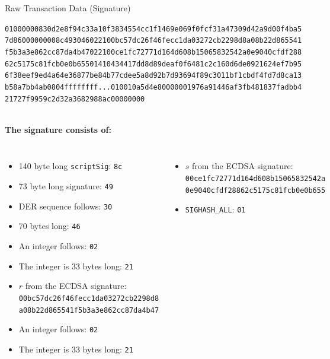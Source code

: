 \documentclass[]{beamer}
\begin{document}
\begin{frame}{Raw Transaction Data (Signature)}
\begin{scriptsize}
\texttt{\textcolor{black!30}{01000000830d2e8f94c33a10f3834554cc1f1469e069f0fcf31a47309d42a9d00f4ba5
7d8600000000}{\alert<2>{8c}\alert<3>{49}\alert<4>{30}\alert<5>{46}\alert<6>{02}\alert<7>{21}\alert<8>{00bc57dc26f46fecc1da03272cb2298d8a08b22d865541
f5b3a3e862cc87da4b47}\alert<9>{02}\alert<10>{21}\alert<11>{00ce1fc72771d164d608b15065832542a0e9040cfdf288
62c5175c81fcb0e0b655}\alert<12>{01}\alert<13>{41}\alert<14>{04}\alert<15>{34417dd8d89deaf0f6481c2c160d6de0921624ef7b95
6f38eef9ed4a64e36877be84b77cdee5a8d92b7d93694f89c3011bf1cbdf4fd7d8ca13
b58a7bb4ab0804}}\textcolor{black!30}{ffffffff...010010a5d4e80000001976a91446af3fb481837fadbb4
21727f9959c2d32a3682988ac00000000}}
\end{scriptsize}
\vspace{1em}
\scriptsize \\
\textbf{The signature consists of:}\\
\begin{columns}[T]
\begin{itemize}
	\item \alert<2>{140 byte long \texttt{scriptSig}: \texttt{8c}}
	\item \alert<3>{73 byte long signature: \texttt{49}}
	\item \alert<4>{DER sequence follows: \texttt{30}}
	\item \alert<5>{70 bytes long: \texttt{46}}
	\item \alert<6>{An integer follows: \texttt{02}}
	\item \alert<7>{The integer is 33 bytes long: \texttt{21}}
	\item \alert<8>{$r$ from the ECDSA signature: 	\texttt{00bc57dc26f46fecc1da03272cb2298d8\\
	a08b22d865541f5b3a3e862cc87da4b47}}
	\item \alert<9>{An integer follows: \texttt{02}}
	\item \alert<10>{The integer is 33 bytes long: \texttt{21}}
\end{itemize}
\begin{itemize}
	\item \alert<11>{$s$ from the ECDSA signature: \texttt{00ce1fc72771d164d608b15065832542a\\
	0e9040cfdf28862c5175c81fcb0e0b655}}
	\item \alert<12>{\texttt{SIGHASH\_ALL}: \texttt{01}}

\end{itemize}
\end{columns}
\end{frame}
\end{document}
